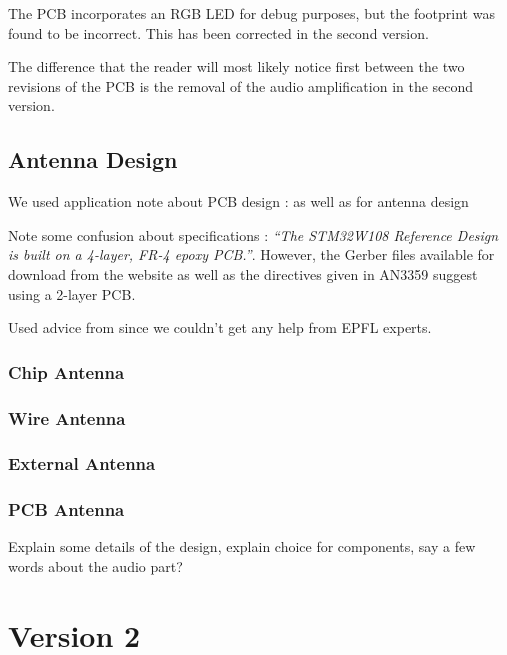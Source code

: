 The PCB incorporates an RGB LED for debug purposes, but the footprint was found
to be incorrect. This has been corrected in the second version.

The difference that the reader will most likely notice first between the two
revisions of the PCB is the removal of the audio amplification in the second
version. 



\subsection{Antenna Design}


We used application note about PCB design : \cite{AN3206} as well as
\cite{AN3359} for antenna design

Note some confusion about specifications : \emph{``The STM32W108 Reference
Design is built on a 4-layer, FR-4 epoxy PCB.''}\cite{AN3206}. However, the
Gerber files available for download from the website as well as the directives
given in AN3359\cite{AN3359} suggest using a 2-layer PCB.

Used advice from \cite{DropoutGuide} since we couldn't get any help from EPFL
experts.

\subsubsection{Chip Antenna}


\subsubsection{Wire Antenna}
\subsubsection{External Antenna}
\subsubsection{PCB Antenna}

Explain some details of the design, explain choice for components, say a few
words about the audio part?

\section{Version 2}

